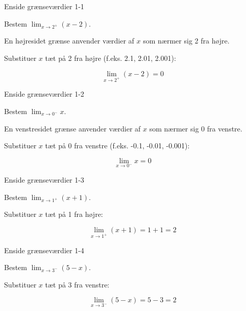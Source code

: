 \documentclass{article}
\begin{document}

\tableofcontents
\newpage

\begin{exercise}{Enside grænseværdier 1-1}

Bestem $\lim_{x \to 2^+} (x - 2)$.


\hint

En højresidet grænse anvender værdier af $x$ som nærmer sig 2 fra højre.

\hint

Substituer $x$ tæt på 2 fra højre (f.eks. 2.1, 2.01, 2.001):

\hint
\[
\lim_{x \to 2^+} (x - 2) = 0
\]

\end{exercise}

\newpage

\begin{exercise}{Enside grænseværdier 1-2}

Bestem $\lim_{x \to 0^-} x$.


\hint

En venstresidet grænse anvender værdier af $x$ som nærmer sig 0 fra venstre.

\hint

Substituer $x$ tæt på 0 fra venstre (f.eks. -0.1, -0.01, -0.001):

\hint
\[
\lim_{x \to 0^-} x = 0
\]

\end{exercise}

\newpage

\begin{exercise}{Enside grænseværdier 1-3}

Bestem $\lim_{x \to 1^+} (x + 1)$.


\hint

Substituer $x$ tæt på 1 fra højre:

\hint
\[
\lim_{x \to 1^+} (x + 1) = 1 + 1 = 2
\]

\end{exercise}

\newpage

\begin{exercise}{Enside grænseværdier 1-4}

Bestem $\lim_{x \to 3^-} (5 - x)$.


\hint

Substituer $x$ tæt på 3 fra venstre:

\hint
\[
\lim_{x \to 3^-} (5 - x) = 5 - 3 = 2
\]

\end{exercise}
\end{document}
